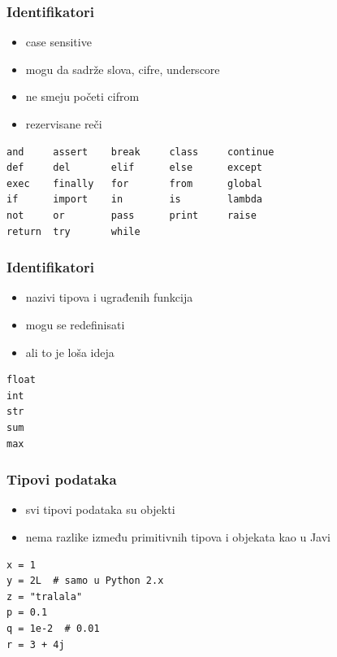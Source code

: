 \documentclass[compress]{beamer}
\begin{document}
\begin{frame}[fragile]
\frametitle{Identifikatori}
\begin{itemize}
  \item case sensitive
  \item mogu da sadrže slova, cifre, underscore
  \item ne smeju početi cifrom
\end{itemize}
\begin{itemize}
  \item rezervisane reči
\end{itemize}
\begin{verbatim}
and     assert    break     class     continue
def     del       elif      else      except
exec    finally   for       from      global
if      import    in        is        lambda
not     or        pass      print     raise
return  try       while
\end{verbatim}
\end{frame}
  
\begin{frame}[fragile]
\frametitle{Identifikatori}
\begin{itemize}
  \item nazivi tipova i ugrađenih funkcija
  \item mogu se redefinisati
  \item ali to je loša ideja
\end{itemize}
\begin{verbatim}
float
int
str
sum
max
\end{verbatim}
\end{frame}
  
\begin{frame}[fragile]
\frametitle{Tipovi podataka}
\begin{itemize}
  \item svi tipovi podataka su objekti
  \item nema razlike između primitivnih tipova i objekata kao u Javi
\end{itemize}
\begin{verbatim}
x = 1
y = 2L  # samo u Python 2.x
z = "tralala"
p = 0.1
q = 1e-2  # 0.01
r = 3 + 4j
\end{verbatim}
\end{frame}
  
\end{document}
